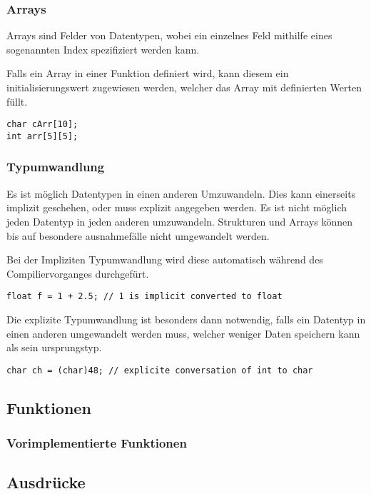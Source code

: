 \subsubsection{Arrays}

Arrays sind Felder von Datentypen, wobei ein einzelnes Feld mithilfe eines sogenannten Index spezifiziert werden kann.

Falls ein Array in einer Funktion definiert wird, kann diesem ein initialisierungswert zugewiesen werden, welcher das Array mit definierten Werten f\"ullt.

\begin{lstlisting}[language=CMM]
char cArr[10];
int arr[5][5];
\end{lstlisting}

\subsubsection{Typumwandlung}

Es ist m\"oglich Datentypen in einen anderen Umzuwandeln. Dies kann einerseits implizit geschehen, oder muss explizit angegeben werden. Es ist nicht m\"oglich jeden Datentyp in jeden anderen umzuwandeln. Strukturen und Arrays können bis auf besondere ausnahmef\"alle nicht umgewandelt werden.


Bei der Impliziten Typumwandlung wird diese automatisch w\"ahrend des Compiliervorganges durchgef\"urt.

\begin{lstlisting}[language=CMM]
float f = 1 + 2.5; // 1 is implicit converted to float
\end{lstlisting}


Die explizite Typumwandlung ist besonders dann notwendig, falls ein Datentyp in einen anderen umgewandelt werden muss, welcher weniger Daten speichern kann als sein ursprungstyp.

\begin{lstlisting}[language=CMM]
char ch = (char)48; // explicite conversation of int to char
\end{lstlisting}

\subsection{Funktionen}

\subsubsection{Vorimplementierte Funktionen}

\subsection{Ausdrücke}

